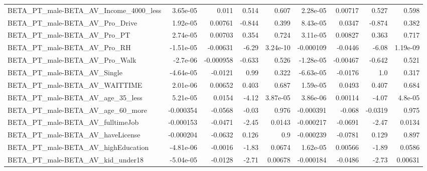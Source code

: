 \begin{tabular}{lrrrrrrrr}
BETA\_PT\_male-BETA\_AV\_Income\_4000\_less              &    3.65e-05 &        0.011 &     0.514 &    0.607 &   2.28e-05 &     0.00717 &        0.527 &         0.598 \\
BETA\_PT\_male-BETA\_AV\_Pro\_Drive                     &    1.92e-05 &      0.00761 &    -0.844 &    0.399 &   8.43e-05 &      0.0347 &       -0.874 &         0.382 \\
BETA\_PT\_male-BETA\_AV\_Pro\_PT                        &    2.74e-05 &      0.00703 &     0.354 &    0.724 &   3.11e-05 &     0.00827 &        0.363 &         0.717 \\
BETA\_PT\_male-BETA\_AV\_Pro\_RH                        &   -1.51e-05 &     -0.00631 &     -6.29 & 3.24e-10 &  -0.000109 &     -0.0446 &        -6.08 &      1.19e-09 \\
BETA\_PT\_male-BETA\_AV\_Pro\_Walk                      &    -2.7e-06 &    -0.000958 &    -0.633 &    0.526 &  -1.28e-05 &    -0.00467 &       -0.642 &         0.521 \\
BETA\_PT\_male-BETA\_AV\_Single                        &   -4.64e-05 &      -0.0121 &      0.99 &    0.322 &  -6.63e-05 &     -0.0176 &          1.0 &         0.317 \\
BETA\_PT\_male-BETA\_AV\_WAITTIME                      &    2.01e-06 &      0.00652 &     0.403 &    0.687 &   1.59e-05 &      0.0493 &        0.407 &         0.684 \\
BETA\_PT\_male-BETA\_AV\_age\_35\_less                   &    5.21e-05 &       0.0154 &     -4.12 & 3.87e-05 &   3.86e-06 &     0.00114 &        -4.07 &       4.8e-05 \\
BETA\_PT\_male-BETA\_AV\_age\_60\_more                   &   -0.000354 &      -0.0568 &     -0.03 &    0.976 &  -0.000391 &      -0.068 &      -0.0319 &         0.975 \\
BETA\_PT\_male-BETA\_AV\_fulltimeJob                   &   -0.000153 &      -0.0471 &     -2.45 &   0.0143 &  -0.000217 &     -0.0691 &        -2.47 &        0.0134 \\
BETA\_PT\_male-BETA\_AV\_haveLicense                   &   -0.000204 &      -0.0632 &     0.126 &      0.9 &  -0.000239 &     -0.0781 &        0.129 &         0.897 \\
BETA\_PT\_male-BETA\_AV\_highEducation                 &   -4.81e-06 &      -0.0016 &     -1.83 &   0.0674 &   1.62e-05 &     0.00566 &        -1.89 &        0.0586 \\
BETA\_PT\_male-BETA\_AV\_kid\_under18                   &   -5.04e-05 &      -0.0128 &     -2.71 &  0.00678 &  -0.000184 &     -0.0486 &        -2.73 &       0.00631 \\

\end{tabular}
